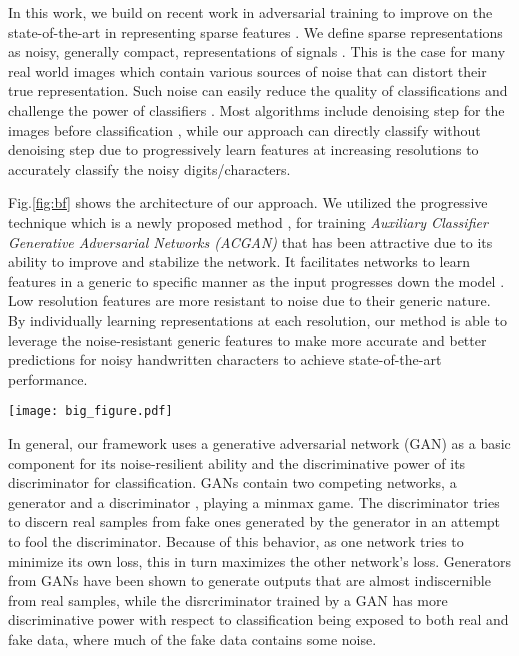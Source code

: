 \documentclass[runningheads]{llncs}
\begin{document}
In this work, we build on recent work in adversarial training \cite{nvidia2017progressive} to improve on the state-of-the-art in representing sparse features \cite{yosinski2014transferable, basu2017learning, nvidia2017progressive}. We define sparse representations as noisy, generally compact, representations of signals \cite{huang2006sparse}\cite{boureau2008sparse}. This is the case for many real world images which contain various sources of noise that can distort their true representation. Such noise can easily reduce the quality of classifications and challenge the power of classifiers \cite{noise1}\cite{noise2}. Most algorithms include denoising step for the images before classification \cite{Karki18}, while our approach can directly classify without denoising step due to progressively learn features at increasing resolutions to accurately classify the noisy digits/characters.

Fig.\ref{fig:bf} shows the architecture of our approach. We utilized the progressive technique which is a newly proposed method  \cite{nvidia2017progressive},  for training \emph{Auxiliary Classifier Generative Adversarial Networks (ACGAN)} that has been attractive due to its ability to improve and stabilize the network. It facilitates networks to learn features in a generic to specific manner as the input progresses down the model \cite{yosinski2014transferable}. Low resolution features are more resistant to noise due to their generic nature. By individually learning representations at each resolution, our method is able to leverage  the noise-resistant generic features to make more accurate and better predictions for  noisy handwritten characters to achieve  state-of-the-art performance.

\begin{figure*}[t!]
\centering
\texttt{[image: big\_figure.pdf]}
\caption{Overview of our proposed Progressively Trained Classifier Generative Adversarial Networks (PCGAN-CHAR) architecture.}
\label{fig:bf}
\end{figure*}

In general, our framework uses a generative adversarial network (GAN) \cite{Goodfellow-GAN} as a basic component for its  noise-resilient ability and   the discriminative power of its discriminator for classification. GANs contain two competing networks, a generator and a discriminator \cite{Goodfellow-GAN}, playing a minmax game. The discriminator \cite{Goodfellow-GAN} tries to discern real samples from fake ones generated by the generator in an attempt to fool the discriminator. Because of this behavior, as one network tries to minimize its own loss,  this in turn maximizes the other network's loss. Generators from GANs have been shown to generate outputs that are almost indiscernible from real samples, while the disrcriminator trained by a GAN has more discriminative power with respect to classification being exposed to both real and fake data, where much of the fake data contains some noise.
\end{document}
